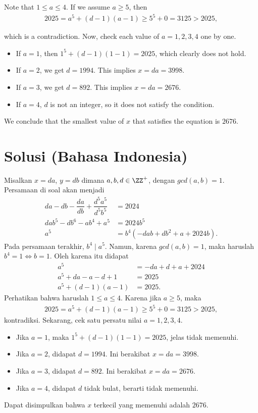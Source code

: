 Note that \( 1 \le a \le 4 \). If we assume \( a \ge 5 \), then
\begin{align*}
    2025 = a^5 + (d-1)(a-1) \ge 5^5 + 0 = 3125 > 2025,
\end{align*}

which is a contradiction. Now, check each value of \( a = 1, 2, 3, 4 \) one by one.
\begin{itemize}
    \item If \( a = 1 \), then \( 1^5 + (d-1)(1-1) = 2025 \), which clearly does not hold.
    \item If \( a = 2 \), we get \( d = 1994 \). This implies \( x = da = 3998 \).
    \item If \( a = 3 \), we get \( d = 892 \). This implies \( x = da = 2676 \).
    \item If \( a = 4 \), \( d \) is not an integer, so it does not satisfy the condition.
\end{itemize}

We conclude that the smallest value of \( x \) that satisfies the equation is \( \boxed{2676} \).

\section{Solusi (Bahasa Indonesia)}
    Misalkan $x=da$, $y=db$ dimana $a,b,d \in \ZZ^+$, dengan $gcd(a,b)=1$. Persamaan di soal akan menjadi
    \begin{align*}
        da-db-\dfrac{da}{db}+\dfrac{d^5a^5}{d^5b^5} &= 2024\\
        dab^5-db^6-ab^4+a^5 &= 2024b^5\\
        a^5 &= b^4(-dab+db^2+a+2024b).
    \end{align*}
    Pada persamaan terakhir, $b^4 \mid a^5$. Namun, karena $gcd(a,b)=1$, maka haruslah $b^4=1 \iff b=1$. Oleh karena itu didapat
    \begin{align*}
        a^5 &= -da+d+a+2024\\
        a^5 + da - a - d + 1 &= 2025\\
        a^5 + (d-1)(a-1) &= 2025.
    \end{align*}
    Perhatikan bahwa haruslah $1 \le a \le 4$. Karena jika $a\ge 5$, maka
    \begin{align*}
        2025 = a^5 + (d-1)(a-1) \ge 5^5 + 0 = 3125 > 2025,
    \end{align*}
    kontradiksi.
    Sekarang, cek satu persatu nilai $a=1,2,3,4$.
    \begin{itemize}
        \item Jika $a=1$, maka $1^5+(d-1)(1-1) = 2025$, jelas tidak memenuhi.
        \item Jika $a=2$, didapat $d=1994$. Ini berakibat $x=da=3998$.
        \item Jika $a=3$, didapat $d=892$. Ini berakibat $x=da=2676$.
        \item Jika $a=4$, didapat $d$ tidak bulat, berarti tidak memenuhi.
    \end{itemize}
    Dapat disimpulkan bahwa $x$ terkecil yang memenuhi adalah $\boxed{2676}$.
